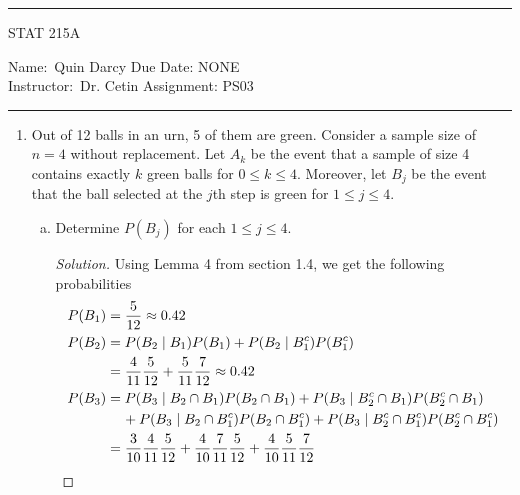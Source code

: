 \documentclass[12pt]{article}
\newenvironment{solution}
{\renewcommand\qedsymbol{$\blacksquare$}\begin{proof}[Solution]}
{\end{proof}}
\begin{document}
    \thispagestyle{empty}\hrule

    \begin{center}
        \vspace{.4cm} { \large STAT 215A}
    \end{center}
    {Name:\ Quin Darcy \hspace{\fill} Due Date: NONE   \\
    { Instructor:}\ Dr. Cetin \hspace{\fill} Assignment:
    PS03 \\ \hrule}

    \begin{enumerate}
        \item Out of 12 balls in an urn, 5 of them are green. Consider a sample
            size of $n=4$ without replacement. Let $A_k$ be the event that
            a sample of size 4 contains exactly $k$ green balls for $0\leq
            k\leq 4$. Moreover, let $B_j$ be the event that the ball selected
            at the $j$th step is green for $1\leq j\leq 4$.
            \begin{enumerate}[(a)]
                \item Determine $P(B_j)$ for each $1\leq j\leq 4$. 
                    \begin{solution}
                        Using Lemma 4 from section 1.4, we get the following
                        probabilities 
                        \begin{align*}
                            P(B_1) &= \frac{5}{12} \approx 0.42\\
                            P(B_2) &= P(B_2\mid B_1)P(B_1)+P(B_2\mid
                            B_1^c)P(B_1^c) \\
                            &=
                            \frac{4}{11}\frac{5}{12}
                            +\frac{5}{11}\frac{7}{12}
                            \approx 0.42 \\
                            P(B_3)&=P(B_3\mid B_2\cap B_1)P(B_2\cap
                            B_1)+P(B_3\mid B_2^c\cap B_1)P(B_2^c\cap
                            B_1)\\
                            &\hspace{4mm}+P(B_3\mid B_2\cap B_1^c)P(B_2\cap
                            B_1^c)+P(B_3\mid B_2^c\cap B_1^c)P(B_2^c\cap B_1^c) \\
                            &=\frac{3}{10}\frac{4}{11}\frac{5}{12}
                            +\frac{4}{10}\frac{7}{11}\frac{5}{12}
                            +\frac{4}{10}\frac{5}{11}\frac{7}{12}

\end{align*}
\end{solution}
\end{enumerate}
\end{enumerate}
\end{document}

